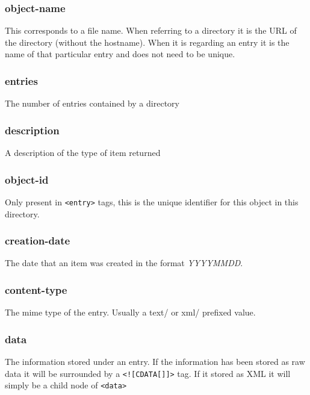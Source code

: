 \documentclass{report}
\begin{document}
\begin{appendices}
\subsubsection{object-name}
This corresponds to a file name. When referring to a directory it is
the URL of the directory (without the hostname). When it is regarding
an entry it is the name of that particular entry and does not need to be unique.

\subsubsection{entries}
The number of entries contained by a directory

\subsubsection{description}
A description of the type of item returned

\subsubsection{object-id}
Only present in \texttt{<entry>} tags, this is the unique identifier
for this object in this directory.

\subsubsection{creation-date}
The date that an item was created in the format \textit{YYYYMMDD}.

\subsubsection{content-type}
The mime type of the entry. Usually a text/ or xml/ prefixed value.

\subsubsection{data}

The information stored under an entry. If the information has been
stored as raw data it will be surrounded by a \texttt{<![CDATA[]]>}
tag. If it stored as XML it will simply be a child node of
\texttt{<data>}



\end{appendices}
\end{document}
